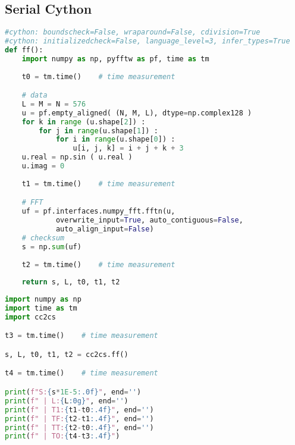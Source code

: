 \subsection{Serial Cython}
\begin{lstlisting}[language=Python, caption={Serial Cython implementation of the FFT test case - Cython module.}]
#cython: boundscheck=False, wraparound=False, cdivision=True
#cython: initializedcheck=False, language_level=3, infer_types=True
def ff():
    import numpy as np, pyfftw as pf, time as tm
    
    t0 = tm.time()    # time measurement

    # data
    L = M = N = 576
    u = pf.empty_aligned( (N, M, L), dtype=np.complex128 )
    for k in range (u.shape[2]) :
        for j in range(u.shape[1]) :
            for i in range(u.shape[0]) :
                u[i, j, k] = i + j + k + 3
    u.real = np.sin ( u.real )
    u.imag = 0
    
    t1 = tm.time()    # time measurement

    # FFT
    uf = pf.interfaces.numpy_fft.fftn(u,
            overwrite_input=True, auto_contiguous=False,
            auto_align_input=False)
    # checksum
    s = np.sum(uf)
    
    t2 = tm.time()    # time measurement
    
    return s, L, t0, t1, t2
\end{lstlisting}




\begin{lstlisting}[language=Python, caption={Serial Cython implementation of the FFT test case - Python main code.}]
import numpy as np
import time as tm
import cc2cs

t3 = tm.time()    # time measurement

s, L, t0, t1, t2 = cc2cs.ff()

t4 = tm.time()    # time measurement

print(f"S:{s*1E-5:.0f}", end='')
print(f" | L:{L:0g}", end='')
print(f" | T1:{t1-t0:.4f}", end='')
print(f" | TF:{t2-t1:.4f}", end='')
print(f" | TT:{t2-t0:.4f}", end='')
print(f" | TO:{t4-t3:.4f}")
\end{lstlisting}




